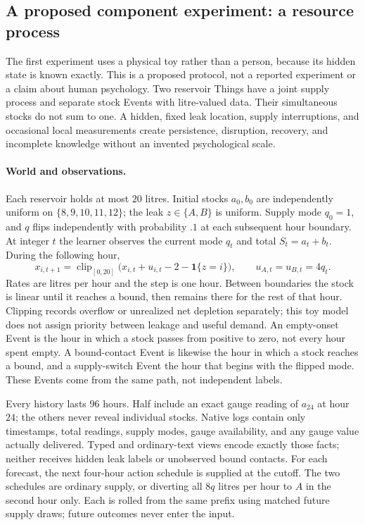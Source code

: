 \documentclass[10pt]{article}
\begin{document}
\subsection{A proposed component experiment: a resource process}
\label{sec:first-experiment}

The first experiment uses a physical toy rather than a person, because its hidden
state is known exactly.
This is a proposed protocol, not a reported experiment or a claim about human
psychology. Two reservoir Things have a joint supply process and separate
stock Events with litre-valued data. Their simultaneous stocks do not sum to
one. A hidden, fixed leak location, supply interruptions, and occasional local
measurements create persistence, disruption, recovery, and incomplete
knowledge without an invented psychological scale.

\paragraph{World and observations.}
Each reservoir holds at most $20$ litres. Initial stocks $a_0,b_0$ are
independently uniform on $\{8,9,10,11,12\}$; the leak $z\in\{A,B\}$ is uniform.
Supply mode $q_0=1$, and $q$ flips independently with probability $.1$ at each
subsequent hour boundary. At integer $t$ the learner observes the current mode
$q_t$ and total $S_t=a_t+b_t$. During the following hour,
\begin{equation}
 x_{i,t+1}=\operatorname{clip}_{[0,20]}
   \bigl(x_{i,t}+u_{i,t}-2-\mathbf 1\{z=i\}\bigr),
 \qquad u_{A,t}=u_{B,t}=4q_t .
 \label{eq:reservoir}
\end{equation}
Rates are litres per hour and the step is one hour. Between boundaries the
stock is linear until it reaches a bound, then remains there for the rest of
that hour. Clipping records overflow or unrealized net depletion separately;
this toy model does not assign priority between leakage and useful demand.
An empty-onset Event is the hour in which a stock passes from positive to zero, not
every hour spent empty. A bound-contact Event is likewise the hour in which a stock
reaches a bound, and a supply-switch Event the hour that begins with the flipped mode.
These Events come from the same path, not independent labels.

Every history lasts $96$ hours. Half include an exact gauge reading of $a_{24}$
at hour $24$; the others never reveal individual stocks. Native logs contain
only timestamps, total readings, supply modes, gauge availability, and any
gauge value actually delivered. Typed and ordinary-text views encode exactly
those facts; neither receives hidden leak labels or unobserved bound contacts.
For each forecast, the next four-hour action schedule is supplied at the
cutoff. The two schedules are ordinary supply, or diverting all $8q$ litres per
hour to $A$ in the second hour only. Each is rolled from the same prefix using
matched future supply draws; future outcomes never enter the input.
\end{document}
